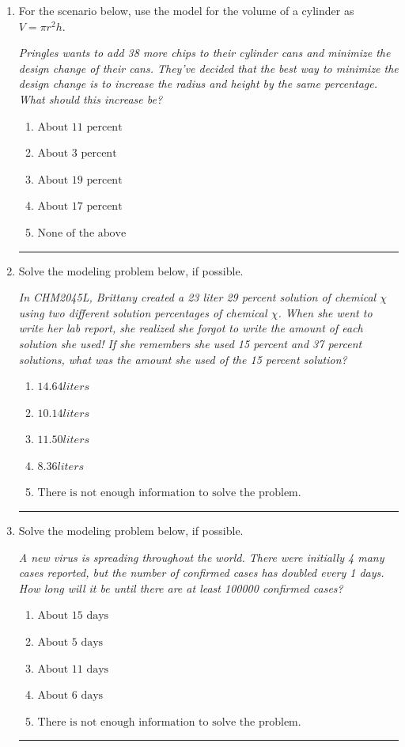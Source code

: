 \documentclass[14pt]{extbook}
\newcommand{\litem}[1]{\item#1\hspace*{-1cm}\rule{\textwidth}{0.4pt}}
\begin{document}
\begin{enumerate}
{\begin{enumerate}[label=\Alph*.]
\end{enumerate} }
\litem{
For the scenario below, use the model for the volume of a cylinder as $V = \pi r^2 h$.
\begin{center}
    \textit{ Pringles wants to add 38 \text{percent} more chips to their cylinder cans and minimize the design change of their cans. They've decided that the best way to minimize the design change is to increase the radius and height by the same percentage. What should this increase be? }
\end{center}
\begin{enumerate}[label=\Alph*.]
\item \( \text{About } 11 \text{ percent} \)
\item \( \text{About } 3 \text{ percent} \)
\item \( \text{About } 19 \text{ percent} \)
\item \( \text{About } 17 \text{ percent} \)
\item \( \text{None of the above} \)

\end{enumerate} }
\litem{
Solve the modeling problem below, if possible.
\begin{center}
    \textit{ In CHM2045L, Brittany created a 23 liter 29 percent solution of chemical $\chi$ using two different solution percentages of chemical $\chi$. When she went to write her lab report, she realized she forgot to write the amount of each solution she used! If she remembers she used 15 percent and 37 percent solutions, what was the amount she used of the 15 percent solution? }
\end{center}
\begin{enumerate}[label=\Alph*.]
\item \( 14.64 liters \)
\item \( 10.14 liters \)
\item \( 11.50 liters \)
\item \( 8.36 liters \)
\item \( \text{There is not enough information to solve the problem.} \)

\end{enumerate} }
\litem{
Solve the modeling problem below, if possible.
\begin{center}
    \textit{ A new virus is spreading throughout the world. There were initially 4 many cases reported, but the number of confirmed cases has doubled every 1 days. How long will it be until there are at least 100000 confirmed cases? }
\end{center}
\begin{enumerate}[label=\Alph*.]
\item \( \text{About } 15 \text{ days} \)
\item \( \text{About } 5 \text{ days} \)
\item \( \text{About } 11 \text{ days} \)
\item \( \text{About } 6 \text{ days} \)
\item \( \text{There is not enough information to solve the problem.} \)


\end{enumerate}}
\end{enumerate}
\end{document}
